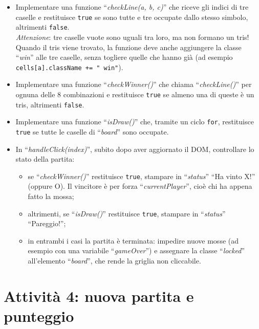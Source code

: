 \documentclass[a4paper,11pt]{article}
\newcommand{\elem}[1]{``\textit{#1}''}
\begin{document}
\begin{itemize}
    \item Implementare una funzione \elem{checkLine(a, b, c)} che riceve gli
    indici di tre caselle e restituisce \texttt{true} se sono tutte e tre
    occupate dallo stesso simbolo, altrimenti \texttt{false}.\\
    \textit{Attenzione}: tre caselle vuote sono uguali tra loro, ma non
    formano un tris!\\
    Quando il tris viene trovato, la funzione deve anche aggiungere la classe
    \elem{win} alle tre caselle, senza togliere quelle che hanno già (ad
    esempio \texttt{cells[a].className += " win"}).

    \item Implementare una funzione \elem{checkWinner()} che chiama
    \elem{checkLine()} per ognuna delle 8 combinazioni e restituisce
    \texttt{true} se almeno una di queste è un tris, altrimenti
    \texttt{false}.

    \item Implementare una funzione \elem{isDraw()} che, tramite un ciclo
    \texttt{for}, restituisce \texttt{true} se tutte le caselle di
    \elem{board} sono occupate.

    \item In \elem{handleClick(index)}, subito dopo aver aggiornato il DOM,
    controllare lo stato della partita:
    \begin{itemize}
        \item[--] se \elem{checkWinner()} restituisce \texttt{true}, stampare
        in \elem{status} ``Ha vinto X!'' (oppure O). Il vincitore è per forza
        \elem{currentPlayer}, cioè chi ha appena fatto la mossa;
        \item[--] altrimenti, se \elem{isDraw()} restituisce \texttt{true},
        stampare in \elem{status} ``Pareggio!'';
        \item[--] in entrambi i casi la partita è terminata: impedire nuove
        mosse (ad esempio con una variabile \elem{gameOver}) e assegnare la
        classe \elem{locked} all'elemento \elem{board}, che rende la griglia
        non cliccabile.
    \end{itemize}
\end{itemize}

\section*{Attività 4: nuova partita e punteggio}
\end{document}
